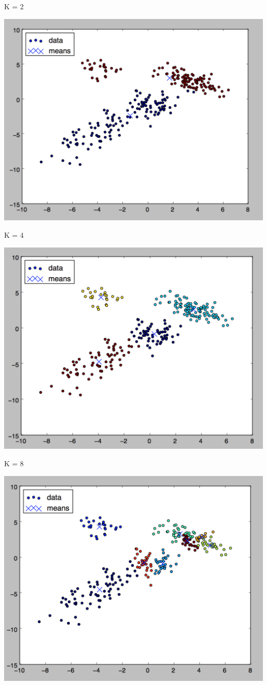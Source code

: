 \documentclass[twoside,11pt]{homework}
\begin{document}
K = 2

\includegraphics[scale=.5]{images/em_2_plot.png}

K = 4

\includegraphics[scale=.5]{images/em_4_plot.png}

K = 8

\includegraphics[scale=.5]{images/em_8_plot.png}
\end{document}
